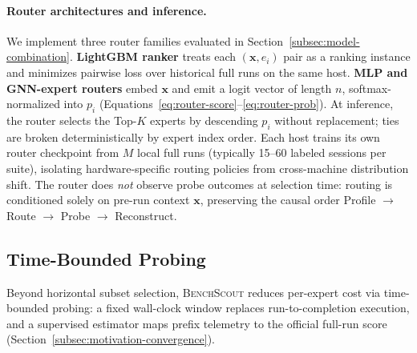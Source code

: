 \documentclass[sigplan,10pt]{acmart}
\newcommand{\ourmethod}{\textsc{BenchScout}\xspace}
\begin{document}
\paragraph{Router architectures and inference.}
We implement three router families evaluated in Section~\ref{subsec:model-combination}.
\textbf{LightGBM ranker} treats each $(\mathbf{x}, e_i)$ pair as a ranking instance and minimizes pairwise loss over historical full runs on the same host.
\textbf{MLP and GNN-expert routers} embed $\mathbf{x}$ and emit a logit vector of length $n$, softmax-normalized into $p_i$ (Equations~\ref{eq:router-score}--\ref{eq:router-prob}).
At inference, the router selects the Top-$K$ experts by descending $p_i$ without replacement; ties are broken deterministically by expert index order.
Each host trains its own router checkpoint from $M$ local full runs (typically 15--60 labeled sessions per suite), isolating hardware-specific routing policies from cross-machine distribution shift.
The router does \emph{not} observe probe outcomes at selection time: routing is conditioned solely on pre-run context $\mathbf{x}$, preserving the causal order Profile $\rightarrow$ Route $\rightarrow$ Probe $\rightarrow$ Reconstruct.


\subsection{Time-Bounded Probing}
\label{subsec:time-bounded-probing}

Beyond horizontal subset selection, \ourmethod reduces per-expert cost via time-bounded probing: a fixed wall-clock window replaces run-to-completion execution, and a supervised estimator maps prefix telemetry to the official full-run score (Section~\ref{subsec:motivation-convergence}).
\end{document}
